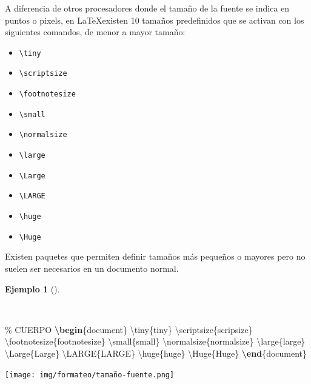 \documentclass[
  a4paper,
]{scrreport}
\newenvironment{Shaded}{\begin{snugshade}}{\end{snugshade}}
\newcommand{\CommentTok}[1]{\textcolor[rgb]{0.37,0.37,0.37}{#1}}
\newcommand{\ExtensionTok}[1]{\textcolor[rgb]{0.00,0.23,0.31}{#1}}
\newcommand{\FunctionTok}[1]{\textcolor[rgb]{0.28,0.35,0.67}{#1}}
\newcommand{\KeywordTok}[1]{\textcolor[rgb]{0.00,0.23,0.31}{\textbf{#1}}}
\newcommand{\NormalTok}[1]{\textcolor[rgb]{0.00,0.23,0.31}{#1}}
\providecommand{\tightlist}{%
  \setlength{\itemsep}{0pt}\setlength{\parskip}{0pt}}\usepackage{longtable,booktabs,array}
\theoremstyle{definition}
\newtheorem{example}{Ejemplo}[chapter]
\theoremstyle{remark}
\begin{document}
A diferencia de otros procesadores donde el tamaño de la fuente se
indica en puntos o pixels, en \LaTeX existen 10 tamaños predefinidos que
se activan con los siguientes comandos, de menor a mayor tamaño:

\begin{itemize}
\tightlist
\item
  \texttt{\textbackslash{}tiny}
\item
  \texttt{\textbackslash{}scriptsize}
\item
  \texttt{\textbackslash{}footnotesize}
\item
  \texttt{\textbackslash{}small}
\item
  \texttt{\textbackslash{}normalsize}
\item
  \texttt{\textbackslash{}large}
\item
  \texttt{\textbackslash{}Large}
\item
  \texttt{\textbackslash{}LARGE}
\item
  \texttt{\textbackslash{}huge}
\item
  \texttt{\textbackslash{}Huge}
\end{itemize}

Existen paquetes que permiten definir tamaños más pequeños o mayores
pero no suelen ser necesarios en un documento normal.

\begin{example}[]\protect\hypertarget{exm-tamaños-letra}{}\label{exm-tamaños-letra}

~

\begin{Shaded}
\begin{Highlighting}[]
\CommentTok{\% CUERPO}
\KeywordTok{\textbackslash{}begin}\NormalTok{\{}\ExtensionTok{document}\NormalTok{\}}
\FunctionTok{\textbackslash{}tiny}\NormalTok{\{tiny\}}
\FunctionTok{\textbackslash{}scriptsize}\NormalTok{\{scripsize\} }
\FunctionTok{\textbackslash{}footnotesize}\NormalTok{\{footnotesize\}}
\FunctionTok{\textbackslash{}small}\NormalTok{\{small\}}
\FunctionTok{\textbackslash{}normalsize}\NormalTok{\{normalsize\}}
\FunctionTok{\textbackslash{}large}\NormalTok{\{large\} }
\FunctionTok{\textbackslash{}Large}\NormalTok{\{Large\}}
\FunctionTok{\textbackslash{}LARGE}\NormalTok{\{LARGE\}}
\FunctionTok{\textbackslash{}huge}\NormalTok{\{huge\}}
\FunctionTok{\textbackslash{}Huge}\NormalTok{\{Huge\}}
\KeywordTok{\textbackslash{}end}\NormalTok{\{}\ExtensionTok{document}\NormalTok{\}}
\end{Highlighting}
\end{Shaded}

\begin{tcolorbox}[enhanced jigsaw, colframe=quarto-callout-note-color-frame, opacityback=0, title={Salida}, bottomrule=.15mm, left=2mm, coltitle=black, arc=.35mm, leftrule=.75mm, colback=white, rightrule=.15mm, colbacktitle=quarto-callout-note-color!10!white, toprule=.15mm, breakable, opacitybacktitle=0.6, bottomtitle=1mm, toptitle=1mm, titlerule=0mm]

\texttt{[image: img/formateo/tamaño-fuente.png]}

\end{tcolorbox}

\end{example}
\end{document}
